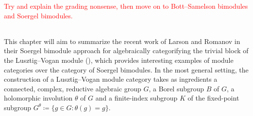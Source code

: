 \noindent\textcolor{red}{Try and explain the grading nonsense, then move on to Bott--Samelson bimodules and Soergel bimodules.}
\newpage

\noindent 

\newpage

\noindent\\ This chapter will aim to summarize the recent work of Larson and Romanov in their Soergel bimodule approach for algebraically categorifying the trivial block of the Lusztig--Vogan module (\cite{LR22}), which provides interesting examples of module categories over the category of Soergel bimodules. In the most general setting, the construction of a Lusztig--Vogan module category takes as ingredients a connected, complex, reductive algebraic group $G$, a Borel subgroup $B$ of $G$, a holomorphic involution $\theta$ of $G$ and a finite-index subgroup $K$ of the fixed-point subgroup $G^\theta \coloneqq \{g \in G : \theta(g) = g\}$.\\

